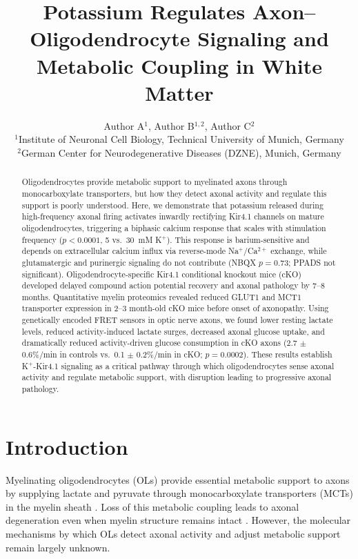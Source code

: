 \documentclass[11pt]{article}
\title{Potassium Regulates Axon--Oligodendrocyte Signaling and Metabolic Coupling in White Matter}
\author{Author A$^{1}$, Author B$^{1,2}$, Author C$^{2}$\\
\small $^{1}$Institute of Neuronal Cell Biology, Technical University of Munich, Germany\\
\small $^{2}$German Center for Neurodegenerative Diseases (DZNE), Munich, Germany}
\date{}
\begin{document}
\maketitle

\begin{abstract}
Oligodendrocytes provide metabolic support to myelinated axons through monocarboxylate transporters, but how they detect axonal activity and regulate this support is poorly understood. Here, we demonstrate that potassium released during high-frequency axonal firing activates inwardly rectifying Kir4.1 channels on mature oligodendrocytes, triggering a biphasic calcium response that scales with stimulation frequency ($p < 0.0001$, 5 vs.\ 30~mM K$^+$). This response is barium-sensitive and depends on extracellular calcium influx via reverse-mode Na$^+$/Ca$^{2+}$ exchange, while glutamatergic and purinergic signaling do not contribute (NBQX $p = 0.73$; PPADS not significant). Oligodendrocyte-specific Kir4.1 conditional knockout mice (cKO) developed delayed compound action potential recovery and axonal pathology by 7--8 months. Quantitative myelin proteomics revealed reduced GLUT1 and MCT1 transporter expression in 2--3 month-old cKO mice before onset of axonopathy. Using genetically encoded FRET sensors in optic nerve axons, we found lower resting lactate levels, reduced activity-induced lactate surges, decreased axonal glucose uptake, and dramatically reduced activity-driven glucose consumption in cKO axons (2.7 $\pm$ 0.6\%/min in controls vs.\ 0.1 $\pm$ 0.2\%/min in cKO; $p = 0.0002$). These results establish K$^+$-Kir4.1 signaling as a critical pathway through which oligodendrocytes sense axonal activity and regulate metabolic support, with disruption leading to progressive axonal pathology.
\end{abstract}

\section{Introduction}

Myelinating oligodendrocytes (OLs) provide essential metabolic support to axons by supplying lactate and pyruvate through monocarboxylate transporters (MCTs) in the myelin sheath \citep{funfschilling2012glycolytic, lee2012oligodendroglia, nave2010myelination}. Loss of this metabolic coupling leads to axonal degeneration even when myelin structure remains intact \citep{philips2017oligodendroglia, simons2014oligodendrocytes}. However, the molecular mechanisms by which OLs detect axonal activity and adjust metabolic support remain largely unknown.
\end{document}
